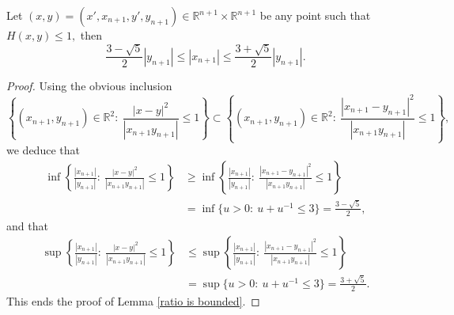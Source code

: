 \documentclass[12pt]{amsart}
\begin{document}
\begin{lemma}\label{ratio is bounded}
Let $(x,y)=(x',x_{n+1},y',y_{n+1})\in\mathbb{R}^{n+1}\times \mathbb{R}^{n+1}$ be any point such that $H(x,y)\leq 1,$ then
$$\frac{3-\sqrt{5}}{2}|y_{n+1}|\leq |x_{n+1}|\leq \frac{3+\sqrt{5}}{2}|y_{n+1}|.$$	
\end{lemma}
\begin{proof} Using the obvious inclusion
$$\left\{(x_{n+1},y_{n+1})\in\mathbb{R}^2:\ \frac{|x-y|^2}{|x_{n+1}y_{n+1}|}\leq 1\right\}\subset \left\{(x_{n+1},y_{n+1})\in\mathbb{R}^2:\ \frac{|x_{n+1}-y_{n+1}|^2}{|x_{n+1}y_{n+1}|}\leq 1\right\},$$
we deduce that
\begin{align*}
\inf\left\{\frac{|x_{n+1}|}{|y_{n+1}|}:\ \frac{|x-y|^2}{|x_{n+1}y_{n+1}|}\leq 1\right\}&\geq\inf\left\{\frac{|x_{n+1}|}{|y_{n+1}|}:\ \frac{|x_{n+1}-y_{n+1}|^2}{|x_{n+1}y_{n+1}|}\leq 1\right\}\\
&=\inf\{u>0:\ u+u^{-1}\leq 3\}=\frac{3-\sqrt{5}}{2},
\end{align*}
and that
\begin{align*}
\sup\left\{\frac{|x_{n+1}|}{|y_{n+1}|}:\ \frac{|x-y|^2}{|x_{n+1}y_{n+1}|}\leq 1\right\}&\leq\sup\left\{\frac{|x_{n+1}|}{|y_{n+1}|}:\ \frac{|x_{n+1}-y_{n+1}|^2}{|x_{n+1}y_{n+1}|}\leq 1\right\}\\
&=\sup\{u>0:\ u+u^{-1}\leq 3\}=\frac{3+\sqrt{5}}{2}.
\end{align*}
This ends the proof of Lemma \ref{ratio is bounded}.
\end{proof}
\end{document}
